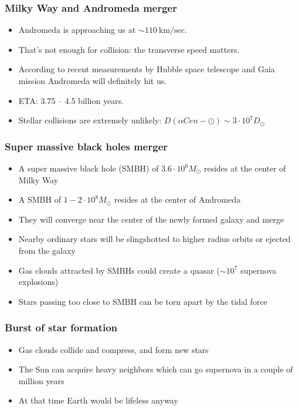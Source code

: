 \documentclass[aspectratio=169]{beamer}
\begin{document}
\begin{frame}
\frametitle{Milky Way and Andromeda merger}
\begin{itemize}
\item Andromeda is approaching us at $\sim 110 \: \mathrm{km/sec}$.
\item That's not enough for collision: the transverse speed matters.
\item According to recent measurements by Hubble space telescope
      \cite{arXiv:1205.6864}
      and Gaia mission \cite{arXiv:1805.04079} Andromeda will
      definitely hit us.
\item ETA: 3.75 -- 4.5 billion years.
\item Stellar collisions are extremely unlikely: $D(\alpha Cen - \odot) \sim 3 \cdot 10^7 D_\odot$ 
\end{itemize}
\end{frame}

\begin{frame}
\frametitle{Super massive black holes merger}
\begin{itemize}
\item A super massive black hole (SMBH) of $3.6 \cdot 10^6 M_\odot$ resides at the center of Milky Way
\item A SMBH of $1 - 2 \cdot 10^8 M_\odot$ resides at the center of Andromeda
\item They will converge near the center of the newly formed galaxy and merge
\item Nearby ordinary stars will be slingshotted to higher radius orbits or ejected from the galaxy
\item Gas clouds attracted by SMBHs could create a quasar ($\sim 10^7$ supernova explosions)
\item Stars passing too close to SMBH can be torn apart by the tidal force
\end{itemize}

\end{frame}

\begin{frame}
\frametitle{Burst of star formation}
\begin{itemize}
\item Gas clouds collide and compress, and form new stars
\item The Sun can acquire heavy neighbors which can go supernova in a couple of million years
\item At that time Earth would be lifeless anyway
\end{itemize}
\end{frame}
\end{document}
